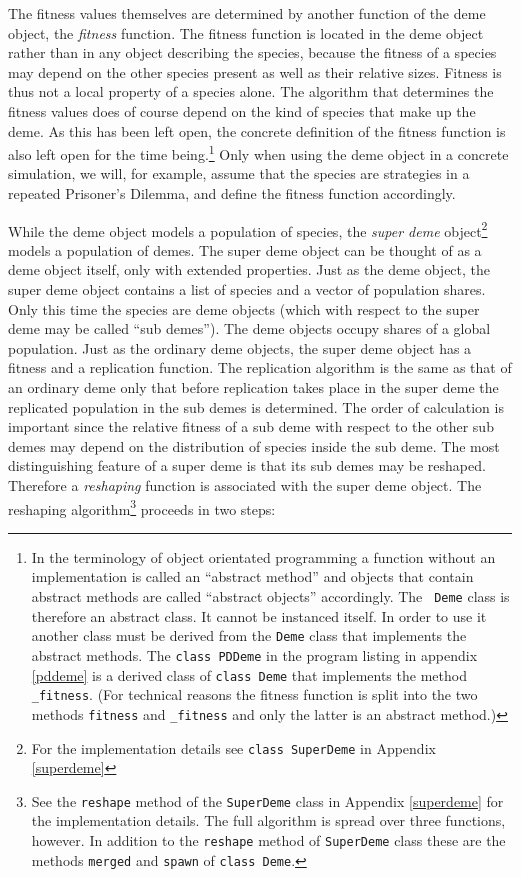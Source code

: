 The fitness values themselves are determined by another function of
the deme object, the {\em fitness} function. The fitness function is
located in the deme object rather than in any object describing the
species, because the fitness of a species may depend on the other
species present as well as their relative sizes. Fitness is thus not a
local property of a species alone. The algorithm that determines the
fitness values does of course depend on the kind of species that make up
the deme. As this has been left open, the concrete definition of the fitness
function is also left open for the time being.\footnote{In the terminology of
object orientated programming a function without an implementation is called an
``abstract method'' and objects that contain abstract methods are called
``abstract objects'' accordingly. The {\tt
Deme} class is therefore an abstract class. It cannot be instanced itself. In
order to use it another class must be derived from the {\tt Deme} class that
implements the abstract methods. The {\tt class PDDeme} in the program listing
in appendix \ref{pddeme} is a derived class of {\tt class Deme} that implements
the method {\tt \_fitness}. (For technical reasons the fitness function is
split into the two methods {\tt fitness} and {\tt \_fitness} and only the
latter is an abstract method.)} Only when using the deme object in a concrete
 simulation, we will, for example, assume that the species are strategies in a
repeated Prisoner's Dilemma, and define the fitness function accordingly.

While the deme object models a population of species, the {\em super
deme} object\footnote{For the implementation details see {\tt class SuperDeme}
in Appendix \ref{superdeme}} models a population of demes. The super deme
object can be thought of as a deme object itself, only with
extended properties. Just as the deme object, the super deme object
contains a list of species and a vector of population shares. Only this
time the species are deme objects (which with respect to the super
deme may be called ``sub demes''). The deme objects occupy shares of a
global population. Just as the ordinary deme objects, the super deme
object has a fitness and a replication function. The replication
algorithm is the same as that of an ordinary deme only that before
replication takes place in the super deme the replicated population in
the sub demes is determined. The order of calculation is important
since the relative fitness of a sub deme with respect to the other sub
demes may depend on the distribution of species inside the sub deme. 
The most distinguishing feature of a super deme is that its sub demes
may be reshaped. Therefore a {\em reshaping} function is associated with the
super deme object. The reshaping algorithm\footnote{See the {\tt reshape}
method of the {\tt SuperDeme} class in Appendix \ref{superdeme} for the
implementation details. The full algorithm is spread over three functions,
however. In addition to the {\tt reshape} method of {\tt SuperDeme} class these
are the methods {\tt merged} and {\tt spawn} of {\tt class Deme}.} proceeds in
two steps:

